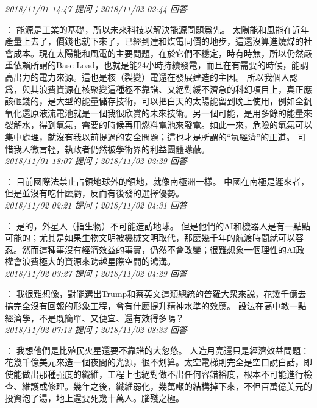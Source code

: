 \documentclass[twocolumn]{ctexart}
\begin{document}
\textit{\hfill\noindent\small 2018/11/01 14:47 提问；2018/11/02 02:44 回答}

：
能源是工業的基礎，所以未來科技以解決能源問題爲先。
太陽能和風能在近年產量上去了，價錢也就下來了，已經到達和煤電同價的地步，這還沒算進燒煤的社會成本。現在太陽能和風電的主要問題，在於它們不穩定，時有時無，所以仍然嚴重依賴所謂的Base Load，也就是能24小時持續發電，而且在有需要的時候，能調高出力的電力來源。這也是核（裂變）電還在發展建造的主因。
所以我個人認爲，與其浪費資源在核聚變這種極不靠譜、又絕對緩不濟急的科幻項目上，真正應該砸錢的，是大型的能量儲存技術，可以把白天的太陽能留到晚上使用，例如全釩氧化還原液流電池就是一個我很欣賞的未來技術。另一個可能，是用多餘的能量來裂解水，得到氫氣，需要的時候再用燃料電池來發電。如此一來，危險的氫氣可以集中處理，就沒有我以前提過的安全問題；這也才是所謂的“氫經濟”的正道。
可惜我人微言輕，執政者仍然被學術界的利益團體矇蔽。
\\

\textit{\hfill\noindent\small 2018/11/01 18:07 提问；2018/11/02 02:29 回答}

：
目前國際法禁止占領地球外的領地，就像南極洲一樣。
中國在南極是遲來者，但是並沒有吃什麽虧，反而有後發的選擇優勢。
\\

\textit{\hfill\noindent\small 2018/11/02 02:21 提问；2018/11/02 04:31 回答}

：
是的，外星人（指生物）不可能造訪地球。 
但是他們的AI和機器人是有一點點可能的；尤其是如果生物文明被機械文明取代，那麽幾千年的航渡時間就可以容忍。然而這種事沒有經濟效益的事實，仍然不會改變；很難想象一個理性的AI政權會浪費極大的資源來跨越星際空間的鴻溝。
\\

\textit{\hfill\noindent\small 2018/11/02 03:27 提问；2018/11/02 04:29 回答}

：
我很難想像，對能選出Trump和蔡英文這類總統的普羅大衆來説，花幾千億去搞完全沒有回報的形象工程，會有什麽提升精神水準的效應。
設法在高中教一點經濟學，不是既簡單、又便宜、還有效得多嗎？
\\

\textit{\hfill\noindent\small 2018/11/02 07:13 提问；2018/11/02 08:33 回答}

：
我想他們是比殖民火星還要不靠譜的大忽悠。
人造月亮還只是經濟效益問題：花幾千億美元來造一個夜間的光源，很不划算。太空電梯則完全是空口說白話，即使能做出那種强度的纖維，工程上也絕對做不出任何容錯裕度，根本不可能進行檢查、維護或修理。幾年之後，纖維弱化，幾萬噸的結構掉下來，不但百萬億美元的投資泡了湯，地上還要死幾十萬人。腦殘之極。
\\
\end{document}
